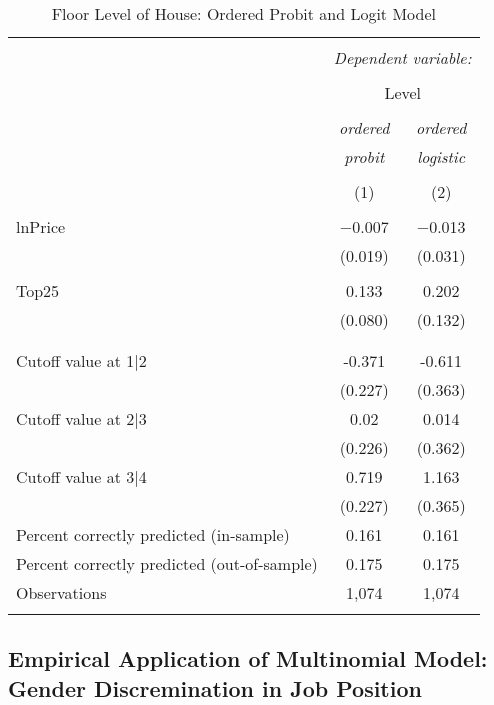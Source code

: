\documentclass[
  12pt,
]{article}
\begin{document}
\begin{table}[t] \centering 
  \caption{Floor Level of House: Ordered Probit and Logit Model} 
  \label{housing} 
\begin{tabular}{@{\extracolsep{5pt}}lcc} 
\\[-1.8ex]\hline 
\hline \\[-1.8ex] 
 & \multicolumn{2}{c}{\textit{Dependent variable:}} \\ 
\cline{2-3} 
\\[-1.8ex] & \multicolumn{2}{c}{Level} \\ 
\\[-1.8ex] & \textit{ordered} & \textit{ordered} \\ 
 & \textit{probit} & \textit{logistic} \\ 
\\[-1.8ex] & (1) & (2)\\ 
\hline \\[-1.8ex] 
 lnPrice & $-$0.007 & $-$0.013 \\ 
  & (0.019) & (0.031) \\ 
  & & \\ 
 Top25 & 0.133 & 0.202 \\ 
  & (0.080) & (0.132) \\ 
  & & \\ 
\hline \\[-1.8ex] 
Cutoff value at 1|2 & -0.371 & -0.611 \\ 
 & (0.227) & (0.363) \\ 
Cutoff value at 2|3 & 0.02 & 0.014 \\ 
 & (0.226) & (0.362) \\ 
Cutoff value at 3|4 & 0.719 & 1.163 \\ 
 & (0.227) & (0.365) \\ 
Percent correctly predicted (in-sample) & 0.161 & 0.161 \\ 
Percent correctly predicted (out-of-sample) & 0.175 & 0.175 \\ 
Observations & 1,074 & 1,074 \\ 
\hline 
\hline \\[-1.8ex] 
\end{tabular} 
\end{table}

\hypertarget{empirical-application-of-multinomial-model-gender-discremination-in-job-position}{%
\subsection{Empirical Application of Multinomial Model: Gender Discremination in Job Position}\label{empirical-application-of-multinomial-model-gender-discremination-in-job-position}}
\end{document}
